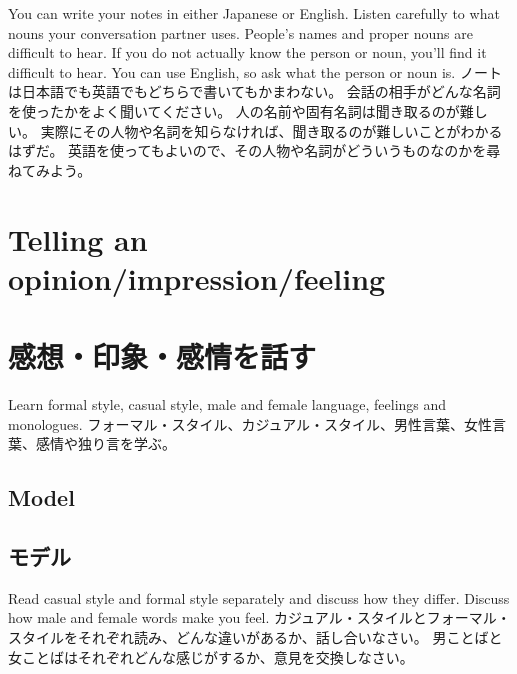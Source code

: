\documentclass[uplatex,dvipdfmx,b5paper,english,10pt]{jsbook}
\begin{document}
\begin{toianswer}
\ifEnglish
You can write your notes in either Japanese or English.
Listen carefully to what nouns your conversation partner uses.
People's names and proper nouns are difficult to hear.
If you do not actually know the person or noun, you'll find it difficult to hear.
You can use English, so ask what the person or noun is.
\else
ノートは日本語でも英語でもどちらで書いてもかまわない。
会話の相手がどんな名詞を使ったかをよく聞いてください。
人の名前や固有名詞は聞き取るのが難しい。
実際にその人物や名詞を知らなければ、聞き取るのが難しいことがわかるはずだ。
英語を使ってもよいので、その人物や名詞がどういうものなのかを尋ねてみよう。
\fi
\end{toianswer}


%

\ifEnglish
  \section{Telling an opinion/impression/feeling}
\else
  \section{感想・印象・感情を話す}
\fi

\ifEnglish
Learn formal style, casual style, male and female language, feelings and monologues.
\else
フォーマル・スタイル、カジュアル・スタイル、男性言葉、女性言葉、感情や独り言を学ぶ。
\fi

\ifEnglish
\subsection{Model}
\else
\subsection{モデル}
\fi

\begin{toiquestion}
\ifEnglish
Read casual style and formal style separately and discuss how they differ.
Discuss how male and female words make you feel.
\else
カジュアル・スタイルとフォーマル・スタイルをそれぞれ読み、どんな違いがあるか、話し合いなさい。
男ことばと女ことばはそれぞれどんな感じがするか、意見を交換しなさい。
\fi
\end{toiquestion}
\end{document}
